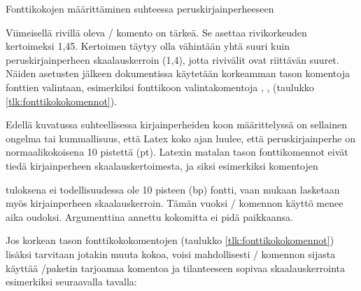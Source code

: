 \begin{esimerkki*}

  \caption{Fonttikokojen määrittäminen suhteessa peruskirjainperheeseen}
  \label{esim:fontti_suhteellinen}
\end{esimerkki*}

Viimeisellä rivillä oleva \-/ komento on tärkeä. Se
asettaa rivikorkeuden kertoimeksi 1,45. Kertoimen täytyy olla vähintään
yhtä suuri kuin peruskirjainperheen skaalauskerroin (1,4), jotta
rivivälit ovat riittävän suuret. Näiden asetusten jälkeen dokumentissa
käytetään korkeamman tason komentoja fonttien valintaan, esimerkiksi
fonttikoon valintakomentoja , ,
 (taulukko \ref{tlk:fonttikokokomennot}).

Edellä kuvatussa suhteellisessa kirjainperheiden koon määrittelyssä on
sellainen ongelma tai kummallisuus, että Latex koko ajan luulee, että
peruskirjainperhe on normaalikokoisena 10 pistettä (pt). Latexin matalan
tason fonttikomennot eivät tiedä kirjainperheen skaalauskertoimesta, ja
siksi esimerkiksi komentojen

\begin{koodilohkosis}
\fontsize{10bp}{12bp} \selectfont
\end{koodilohkosis}

tuloksena ei todellisuudessa ole 10 pisteen (bp) fontti, vaan mukaan
lasketaan myös kirjainperheen skaalauskerroin. Tämän vuoksi
\-/ komennon käyttö menee aika oudoksi. Argumenttina
annettu kokomitta ei pidä paikkaansa.

Jos korkean tason fonttikokokomentojen (taulukko
\ref{tlk:fonttikokokomennot}) lisäksi tarvitaan jotakin muuta kokoa,
voisi mahdollisesti \-/ komennon sijasta käyttää
\-/paketin tarjoamaa komentoa ja tilanteeseen sopivaa
skaalauskerrointa esimerkiksi seuraavalla tavalla:

